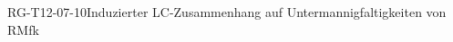 
\begin{PROP}{RG-T12-07-10}{Induzierter LC-Zusammenhang auf Untermannigfaltigkeiten von RMfk}
\end{PROP}
